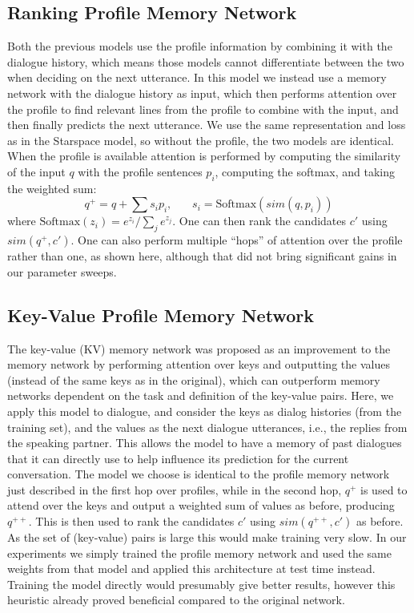 \subsection{Ranking Profile Memory Network}

Both the previous models use the profile information by combining it 
with the dialogue history, which means those models cannot differentiate between the two when deciding on the next utterance. In this model we instead use a memory network with the dialogue history as input, which then performs attention over the profile to find relevant lines from the profile to combine with the input, and then finally predicts the next utterance. We use the same representation and loss as in the Starspace model, so without the profile, the two models are identical.
When the profile is available attention is performed by computing the similarity of the input $q$ with the profile sentences $p_i$, computing the softmax, and taking the weighted sum:
\[
   q^+ = q + \sum s_i p_i,  ~~~~~~~~ s_i = {\mbox{Softmax}}(sim(q, p_i))
\]
where ${\mbox{Softmax}}(z_i) = e^{z_i}/\sum_j e^{z_j}$.
One can then rank the candidates $c'$ using $sim(q^+,c')$.
One can also perform multiple ``hops'' of attention over the profile rather than one, as shown here, although that did not bring significant gains in our parameter sweeps. 


\subsection{Key-Value Profile Memory Network}\label{sec:kvmem}

The key-value (KV) memory network \cite{miller2016key} was proposed as an improvement to the memory network by performing attention over keys and outputting the values (instead of the same keys as in the original), which can outperform memory networks dependent on the task and definition of the key-value pairs. Here, we apply this model to dialogue, and consider the keys as dialog histories (from the training set), and the values as the next dialogue utterances, i.e., the replies from the speaking partner. 
This allows the model to have a memory of past dialogues that it can directly use to help influence its prediction for the current conversation. 
The model we choose is identical to the profile memory network just described in the first hop over profiles, while in the second hop, $q^+$ is used to attend over the keys and output a weighted sum of values as before, producing 
$q^{++}$. This is then used to rank the candidates $c'$  using $sim(q^{++},c')$ as before.  As the set of (key-value) pairs is large this would make training very slow. In our experiments we simply trained the profile memory network and used the same weights from that model and applied this architecture at test time instead. Training the model directly would presumably give better results, however this heuristic already proved beneficial compared to the original network. 

